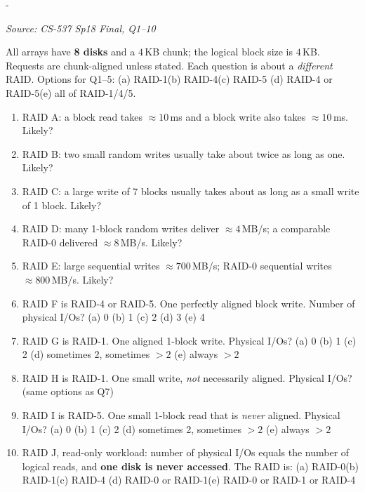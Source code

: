 \documentclass[11pt,a4paper]{article}
\makeatletter
\newcommand{\keepspace}[1]{\par\penalty-100\begingroup
  \setlength{\dimen@}{#1}\dimen@ii\pagegoal\advance\dimen@ii-\pagetotal
  \ifdim\dimen@>\dimen@ii\ifdim\dimen@ii>\z@\vfil\fi\break\fi\endgroup}
\newcounter{qn}[section]
\newenvironment{Qn}[4]{%
  \refstepcounter{qn}\keepspace{7\baselineskip}%
  \begin{tcolorbox}[qboxstyle, title={Q\thesection.\theqn\ \ [#1 \textbar\ #2]\ \ #4}]%
  {\footnotesize\color{g3}\textit{Source: #3}}\par\smallskip%
}{%
  \end{tcolorbox}%
}
\makeatother
\begin{document}
\begin{Qn}{Hard}{Lect 22A}{CS-537 Sp18 Final, Q1--10}{Forensic identification of RAID-0/1/4/5 from timing and physical I/Os}
All arrays have \textbf{8 disks} and a $4$\,KB chunk; the logical block
size is $4$\,KB. Requests are chunk-aligned unless stated. Each question
is about a \emph{different} RAID. Options for Q1--5:
(a) RAID-1\quad (b) RAID-4\quad (c) RAID-5\quad
(d) RAID-4 or RAID-5\quad (e) all of RAID-1/4/5.

\begin{enumerate}
\item[1.] RAID A: a block read takes $\approx 10$\,ms and a block write
      also takes $\approx 10$\,ms. Likely?
\item[2.] RAID B: two small random writes usually take about twice as
      long as one. Likely?
\item[3.] RAID C: a large write of 7 blocks usually takes about as long
      as a small write of 1 block. Likely?
\item[4.] RAID D: many 1-block random writes deliver $\approx 4$\,MB/s;
      a comparable RAID-0 delivered $\approx 8$\,MB/s. Likely?
\item[5.] RAID E: large sequential writes $\approx 700$\,MB/s; RAID-0
      sequential writes $\approx 800$\,MB/s. Likely?
\item[6.] RAID F is RAID-4 or RAID-5. One perfectly aligned block write.
      Number of physical I/Os?
      (a) 0 (b) 1 (c) 2 (d) 3 (e) 4
\item[7.] RAID G is RAID-1. One aligned 1-block write. Physical I/Os?
      (a) 0 (b) 1 (c) 2 (d) sometimes 2, sometimes $>2$ (e) always $>2$
\item[8.] RAID H is RAID-1. One small write, \emph{not} necessarily
      aligned. Physical I/Os?
      (same options as Q7)
\item[9.] RAID I is RAID-5. One small 1-block read that is
      \emph{never} aligned. Physical I/Os?
      (a) 0 (b) 1 (c) 2 (d) sometimes 2, sometimes $>2$ (e) always $>2$
\item[10.] RAID J, read-only workload: number of physical I/Os equals
      the number of logical reads, and \textbf{one disk is never
      accessed}. The RAID is:
      (a) RAID-0\quad (b) RAID-1\quad (c) RAID-4\quad
      (d) RAID-0 or RAID-1\quad (e) RAID-0 or RAID-1 or RAID-4
\end{enumerate}
\end{Qn}
\end{document}
